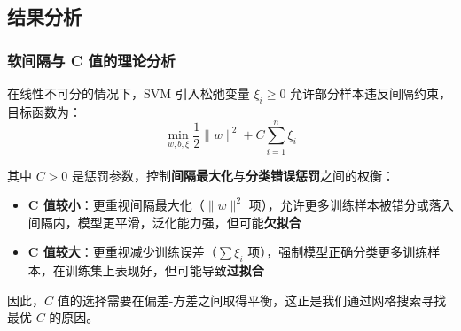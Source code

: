 \documentclass[UTF8]{ctexart}
\begin{document}
\subsection{结果分析}

\subsubsection{软间隔与 C 值的理论分析}

在线性不可分的情况下，SVM 引入松弛变量 $\xi_i \geq 0$ 允许部分样本违反间隔约束，目标函数为：
\begin{equation}
\min_{w,b,\xi} \frac{1}{2}\|w\|^2 + C\sum_{i=1}^{n}\xi_i
\end{equation}

\noindent 其中 $C > 0$ 是惩罚参数，控制\textbf{间隔最大化}与\textbf{分类错误惩罚}之间的权衡：

\begin{itemize}
    \item \textbf{C 值较小}：更重视间隔最大化（$\|w\|^2$ 项），允许更多训练样本被错分或落入间隔内，模型更平滑，泛化能力强，但可能\textbf{欠拟合}
    
    \item \textbf{C 值较大}：更重视减少训练误差（$\sum\xi_i$ 项），强制模型正确分类更多训练样本，在训练集上表现好，但可能导致\textbf{过拟合}
\end{itemize}

\vspace{0.5em}
因此，$C$ 值的选择需要在偏差-方差之间取得平衡，这正是我们通过网格搜索寻找最优 $C$ 的原因。
\end{document}
